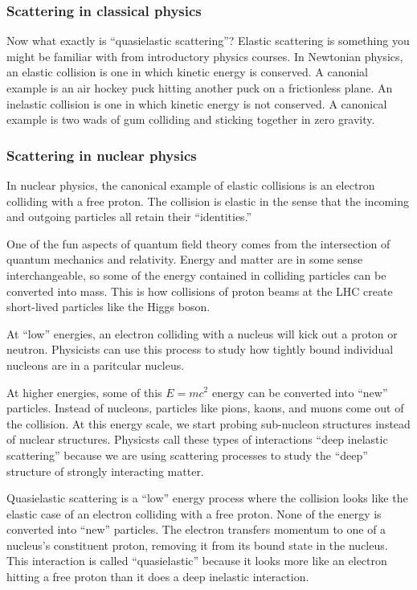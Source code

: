 \subsubsection{Scattering in classical physics}
Now what exactly is “quasielastic scattering”?
Elastic scattering is something you might be familiar with from introductory
physics courses.
In Newtonian physics, an elastic collision is one in which kinetic energy is
conserved.
A canonial example is an air hockey puck hitting another puck on a frictionless
plane.
An inelastic collision is one in which kinetic energy is not conserved.
A canonical example is two wads of gum colliding and sticking together in zero
gravity.

\subsubsection{Scattering in nuclear physics}
In nuclear physics, the canonical example of elastic collisions is an electron
colliding with a free proton.
The collision is elastic in the sense that the incoming and outgoing particles
all retain their “identities.”

One of the fun aspects of quantum field theory comes from the intersection of
quantum mechanics and relativity.
Energy and matter are in some sense interchangeable, so some of the energy
contained in colliding particles can be converted into mass.
This is how collisions of proton beams at the LHC create short-lived particles
like the Higgs boson.

At “low” energies, an electron colliding with a nucleus will kick out a proton
or neutron.
Physicists can use this process to study how tightly bound individual nucleons
are in a paritcular nucleus.

At higher energies, some of this $E=mc^2$ energy can be converted into “new”
particles.
Instead of nucleons, particles like pions, kaons, and muons come out of the
collision.
At this energy scale, we start probing sub-nucleon structures instead of
nuclear structures.
Physicsts call these types of interactions “deep inelastic scattering” because
we are using scattering processes to study the “deep” structure of strongly
interacting matter.

Quasielastic scattering is a “low” energy process where the collision looks
like the elastic case of an electron colliding with a free proton.
None of the energy is converted into “new” particles.
The electron transfers momentum to one of a nucleus’s constituent proton,
removing it from its bound state in the nucleus.
This interaction is called “quasielastic” because it looks more like an
electron hitting a free proton than it does a deep inelastic interaction.

